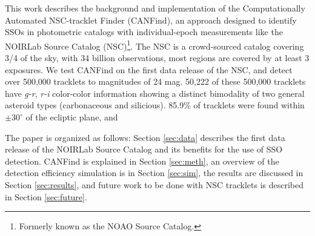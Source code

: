 \documentclass[twocolumn]{aastex62}
\begin{document}
This work describes the background and implementation of the Computationally Automated NSC-tracklet Finder (CANFind), an approach designed to identify SSOs in photometric catalogs with individual-epoch measurements like the NOIRLab Source Catalog (NSC)\footnote{Formerly known as the NOAO Source Catalog.}.  The NSC is a crowd-sourced catalog covering 3/4 of the sky, with 34 billion observations, most regions are covered by at least 3 exposures.  We test CANFind on the first data release of the NSC, and detect over 500,000 tracklets to magnitudes of 24 mag.  50,222 of these 500,000 tracklets have \textit{g-r}, \textit{r-i} color-color information showing a distinct bimodality of two general asteroid types (carbonaceous and silicious). 85.9\% of tracklets were found within $\pm30^{\circ}$ of the ecliptic plane, and   

The paper is organized as follows:  Section \ref{sec:data} describes the first data release of the NOIRLab Source Catalog and its benefits for the use of SSO detection.  CANFind is explained in Section \ref{sec:meth}, an overview of the detection efficiency simulation is in Section \ref{sec:sim}, the results are discussed in Section \ref{sec:results},  and future work to be done with NSC tracklets is described in Section \ref{sec:future}.   



\end{document}
